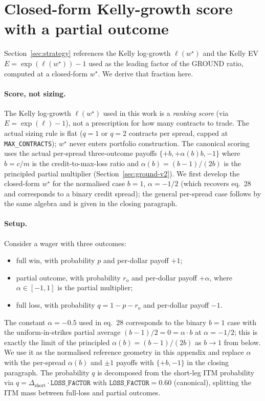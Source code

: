 \documentclass[11pt]{article}
\begin{document}
\appendix

\section{Closed-form Kelly-growth score with a partial outcome}
\label{app:kelly-foc}

Section~\ref{sec:strategy} references the Kelly log-growth
$\ell(w^\star)$ and the Kelly EV $E = \exp(\ell(w^\star)) - 1$ used as
the leading factor of the GROUND ratio, computed at a closed-form
$w^\star$. We derive that fraction here.

\paragraph{Score, not sizing.}
The Kelly log-growth $\ell(w^\star)$ used in this work is a
\emph{ranking score} (via $E = \exp(\ell) - 1$), not a prescription for
how many contracts to trade. The actual sizing rule is flat ($q=1$ or
$q=2$ contracts per spread, capped at \texttt{MAX\_CONTRACTS});
$w^\star$ never enters portfolio construction.
The canonical scoring uses the actual per-spread three-outcome
payoffs $\{+b, +\alpha(b) b, -1\}$ where $b = c/m$ is the
credit-to-max-loss ratio and $\alpha(b) = (b-1)/(2b)$ is the
principled partial multiplier (Section~\ref{sec:ground-v2}).
We first develop the closed-form $w^\star$ for the normalised case
$b = 1$, $\alpha = -1/2$ (which recovers \citet{mercurio2020} eq.~28
and corresponds to a binary credit spread); the general per-spread
case follows by the same algebra and is given in the closing
paragraph.

\paragraph{Setup.}
Consider a wager with three outcomes:
\begin{itemize}
  \item full win, with probability $p$ and per-dollar payoff $+1$;
  \item partial outcome, with probability $r_o$ and per-dollar payoff
        $+\alpha$, where $\alpha \in [-1, 1]$ is the partial multiplier;
  \item full loss, with probability $q = 1 - p - r_o$ and per-dollar
        payoff $-1$.
\end{itemize}
The constant $\alpha = -0.5$ used in \citet{mercurio2020} eq.~28
corresponds to the binary $b=1$ case with the uniform-in-strikes
partial average $(b-1)/2 = 0 = \alpha \cdot b$ at $\alpha = -1/2$;
this is exactly the limit of the principled $\alpha(b) = (b-1)/(2b)$
as $b \to 1$ from below. We use it as the normalised reference
geometry in this appendix and replace $\alpha$ with the per-spread
$\alpha(b)$ and $\pm 1$ payoffs with $\{+b, -1\}$ in the closing
paragraph. The probability $q$ is decomposed from the short-leg
ITM probability via $q = \Delta_{\text{short}} \cdot
\texttt{LOSS\_FACTOR}$ with $\texttt{LOSS\_FACTOR} = 0.60$ (canonical),
splitting the ITM mass between full-loss and partial outcomes.
\end{document}
